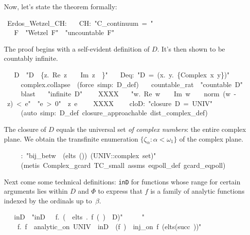 \documentclass[runningheads]{llncs}
\begin{document}
Now, let's state the theorem formally:
\begin{isabelle}
\ Erdos\_Wetzel\_CH:\isanewline
\ \ \ CH:\ "C\_continuum\ =\ "\isanewline
\ \ \ F\ \ "Wetzel\ F"\ \ "uncountable\ F"
\end{isabelle}
%
The proof begins with a self-evident definition of $D$. It's then shown to be countably infinite.
\begin{isabelle}
\ \ \ D\ \ "D\ \isasymequiv \ \{z.\ Re\ z\ \isasymin \ \isasymrat \ \isasymand \ Im\ z\ \isasymin \ \isasymrat \}"\isanewline
\ \ \ Deq:\ "D\ =\ (\isasymUnion x\isasymin \isasymrat .\ \isasymUnion y\isasymin \isasymrat .\ \{Complex\ x\ y\})"\isanewline
\ \ \ \ \ complex.collapse\ \ (force\ simp:\ D\_def)\isanewline
\ \ \ countable\_rat\ \ "countable\ D"\isanewline
\ \ \ \ \ blast\isanewline
\ \ \ "infinite\ D"\isanewline
\ \ \ \ XXXX\isanewline
\ \ \ "\isasymexists w.\ Re\ w\ \isasymin \ \isasymrat \ \isasymand \ Im\ w\ \isasymin \ \isasymrat \ \isasymand \ norm\ (w\ -\ z)\ <\ e"\ \ "e\ >\ 0"\ \ z\ e\isanewline
\ \ \ \ XXXX\isanewline
\ \ \ \ cloD:\ "closure\ D\ =\ UNIV"\isanewline
\ \ \ \ \ (auto\ simp:\ D\_def\ closure\_approachable\ dist\_complex\_def)
\end{isabelle}
The closure of $D$ equals the universal set \textit{of complex numbers}: the entire complex plane.
We obtain the transfinite enumeration $\{\zeta_\alpha : \alpha < \omega_1\}$ of the complex plane.
 \begin{isabelle}
\ \ \ \isasymzeta \ \ \isasymzeta :\ "bij\_betw\ \isasymzeta \ (elts\ ())\ (UNIV::complex\ set)"\isanewline
\ \ \ \ \ (metis\ Complex\_gcard\ TC\_small\ assms\ eqpoll\_def\ gcard\_eqpoll)
\end{isabelle}

 Next come some technical definitions: \texttt{inD} for functions whose range for certain arguments lies within $D$ and $\Phi$ to express that $f$ is a family of analytic functions indexed by the ordinals up to~$\beta$. 

\begin{isabelle}
\ \ \ inD\ \ "inD\ \isasymequiv \ \isasymlambda \isasymbeta \ f.\ (\isasymforall \isasymalpha \ \isasymin \ elts\ \isasymbeta .\ f\ (\isasymzeta \ \isasymalpha )\ \isasymin \ D)"\isanewline
\ \ \ \isasymPhi \ \ "\isasymPhi \ \isasymequiv\isanewline
\ \  \ \isasymlambda \isasymbeta \ f.\ f\ \isasymbeta \ analytic\_on\ UNIV\ \isasymand \ inD\ \isasymbeta \ (f\ \isasymbeta )\ \isasymand \ inj\_on\ f\ (elts(succ\ \isasymbeta ))"
\end{isabelle}
\end{document}
